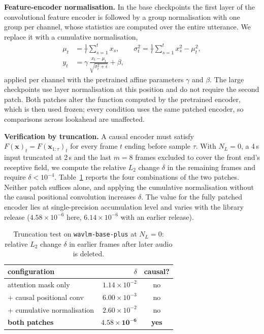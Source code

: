 \documentclass[preprint,12pt,authoryear]{elsarticle}
\begin{document}
\textbf{Feature-encoder normalisation.} In the base checkpoints the first
layer of the convolutional feature encoder is followed by a group
normalisation with one group per channel, whose statistics are computed over
the entire utterance. We replace it with a cumulative normalisation,
\begin{equation}
\begin{aligned}
\mu_t &= \frac{1}{t}\sum_{s=1}^{t} x_s,\qquad
\sigma_t^2 = \frac{1}{t}\sum_{s=1}^{t} x_s^2 - \mu_t^2,\\
y_t &= \gamma\,\frac{x_t-\mu_t}{\sqrt{\sigma_t^2+\epsilon}} + \beta,
\end{aligned}
\label{eq:cumnorm}
\end{equation}
applied per channel with the pretrained affine parameters $\gamma$ and
$\beta$. The large checkpoints use layer normalisation at this position and do
not require the second patch. Both patches alter the function computed by the
pretrained encoder, which is then used frozen; every condition uses the same
patched encoder, so comparisons across lookahead are unaffected.

\textbf{Verification by truncation.} A causal encoder must satisfy
$F(\mathbf{x})_t = F(\mathbf{x}_{1:\tau})_t$ for every frame $t$ ending before
sample $\tau$. With $N_L=0$, a 4\,s input truncated at 2\,s and the last
$m=8$ frames excluded to cover the front end's receptive field, we compute the
relative $L_2$ change $\delta$ in the remaining frames and require
$\delta<10^{-4}$. Table~\ref{tab:causal} reports the four combinations of the
two patches. Neither patch suffices alone, and applying the cumulative
normalisation without the causal positional convolution increases $\delta$.
The value for the fully patched encoder lies at single-precision accumulation
level and varies with the library release ($4.58\times10^{-6}$ here,
$6.14\times10^{-6}$ with an earlier release).

\begin{table}[t]
\centering\footnotesize
\setlength{\tabcolsep}{4pt}
\renewcommand{\arraystretch}{0.93}
\caption{Truncation test on \texttt{wavlm-base-plus} at $N_L=0$: relative
$L_2$ change $\delta$ in earlier frames after later audio is deleted.}
\label{tab:causal}
\begin{tabular}{lrc}
\toprule
configuration & $\delta$ & causal? \\
\midrule
attention mask only        & $1.14\times10^{-2}$ & no \\
\quad + causal positional conv & $6.00\times10^{-3}$ & no \\
\quad + cumulative normalisation & $2.60\times10^{-2}$ & no \\
\textbf{both patches}      & $\mathbf{4.58\times10^{-6}}$ & \textbf{yes} \\
\bottomrule
\end{tabular}
\end{table}
\end{document}
